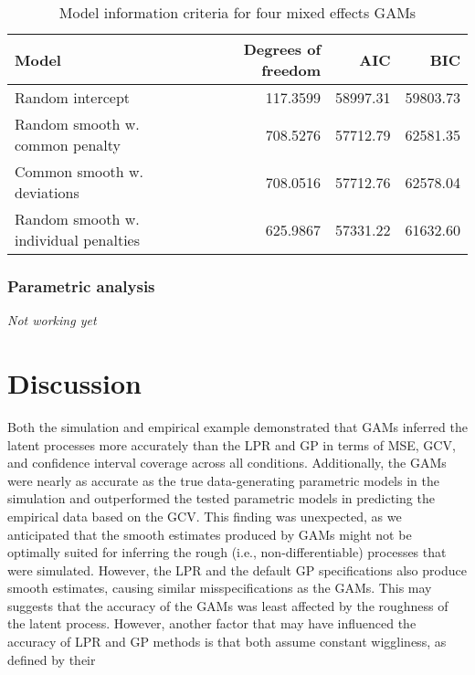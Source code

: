 \documentclass[man, floatsintext]{apa7}
\begin{document}
\begin{table}[htbp]
  \vspace*{2em}
  \begin{threeparttable}
    \caption{Model information criteria for four mixed effects GAMs}
    \label{tab:ic_tab}
    \begin{tabular}{@{}lrrr@{}} \toprule
      Model                                 & Degrees of freedom & AIC      &
      BIC
      \\ \midrule
      Random intercept                      & 117.3599           & 58997.31 &
      59803.73
      \\
      Random smooth w. common penalty       & 708.5276           & 57712.79 &
      62581.35
      \\
      Common smooth w. deviations           & 708.0516           & 57712.76 &
      62578.04
      \\
      Random smooth w. individual penalties & 625.9867           & 57331.22 &
      61632.60
      \\ \midrule
    \end{tabular}
  \end{threeparttable}
\end{table}

\subsubsection{Parametric analysis}

\textit{Not working yet}

\section{Discussion}

Both the simulation and empirical example demonstrated that GAMs inferred the
latent processes more accurately than the LPR and GP in terms of MSE, GCV,
and confidence interval coverage across all conditions. Additionally, the GAMs
were nearly as accurate as the true data-generating parametric models in the
simulation and outperformed the tested parametric models in predicting the
empirical data based on the GCV\@. This finding was unexpected, as we
anticipated
that the smooth estimates produced by GAMs might not be optimally suited for
inferring the rough (i.e., non-differentiable) processes that were simulated.
However, the LPR and the default GP specifications also produce smooth
estimates, causing similar misspecifications as the GAMs. This may suggests
that the accuracy of the GAMs was least affected by the roughness of the latent
process. However, another factor that may have influenced the accuracy of
LPR and GP methods is that both assume constant wiggliness, as defined by their
\end{document}
